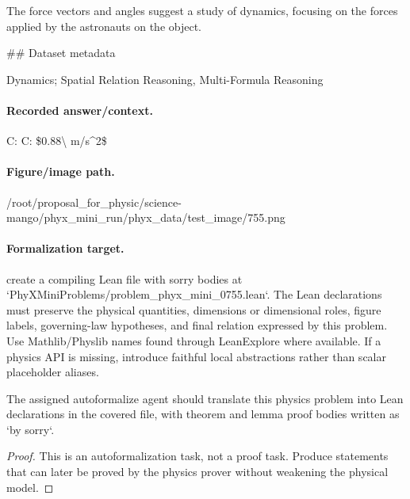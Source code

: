 The force vectors and angles suggest a study of dynamics, focusing on the forces applied by the astronauts on the object.

\#\# Dataset metadata

Dynamics; Spatial Relation Reasoning, Multi-Formula Reasoning

\paragraph{Recorded answer/context.}
C: C: \$0.88\textbackslash{} m/s\textasciicircum{}2\$

\paragraph{Figure/image path.}
/root/proposal\_for\_physic/science-mango/phyx\_mini\_run/phyx\_data/test\_image/755.png

\paragraph{Formalization target.}
create a compiling Lean file with sorry bodies at `PhyXMiniProblems/problem\_phyx\_mini\_0755.lean`. The Lean declarations must preserve the physical quantities, dimensions or dimensional roles, figure labels, governing-law hypotheses, and final relation expressed by this problem.
Use Mathlib/Physlib names found through LeanExplore where available. If a physics API is missing, introduce faithful local abstractions rather than scalar placeholder aliases.

\begin{theorem}
\label{thm:physics:phyx_mini_0755:target}
The assigned autoformalize agent should translate this physics problem into Lean declarations in the covered file, with theorem and lemma proof bodies written as `by sorry`.
\end{theorem}
\begin{proof}
This is an autoformalization task, not a proof task. Produce statements that can later be proved by the physics prover without weakening the physical model.
\end{proof}

